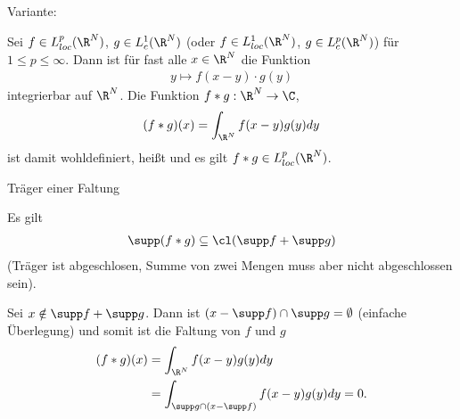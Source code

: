 
Variante:
\begin{korollar}
  Sei $f \in L^{p}_{loc}(\R^{N})$, $g \in L^{1}_{c}(\R^{N})$ (oder $f \in L^{1}_{loc}(\R^{N})$, $g \in L^{p}_{c}(\R^{N})$) für $1 \leq p \leq \infty$. Dann ist für fast alle $x \in \R^{N}$ die Funktion
  \begin{align*}
    y \mapsto f(x-y)\cdot g(y)
  \end{align*}
integrierbar auf $\R^{N}$. Die Funktion $f*g: \R^{N} \to \C$,
\begin{align*}
  (f*g)(x) = \int_{\R^{N}}f(x-y)g(y)dy
\end{align*}
ist damit wohldefiniert, heißt  und es gilt $f*g \in L^{p}_{loc}(\R^{N})$.   
\end{korollar}
\begin{lemma} Träger einer Faltung

  Es gilt
  \begin{align*}
    \supp(f*g) \subseteq \cl(\supp f + \supp g)
  \end{align*}
(Träger ist abgeschlosen, Summe von zwei Mengen muss aber nicht abgeschlossen sein). 
\end{lemma}

\begin{beweis}
  Sei $x \notin \supp f + \supp g$. Dann ist $(x - \supp f) \cap \supp g = \emptyset$ (einfache Überlegung) und somit ist die Faltung von $f$ und $g$
  \begin{align*}
    (f*g)(x) &= \int_{\R^{N}}f(x-y)g(y) dy\\
&= \int_{\supp g \cap (x- \supp f)} f(x-y)g(y)dy = 0. 
  \end{align*}
\end{beweis}


